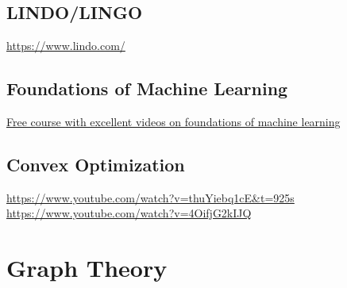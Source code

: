 \documentclass[letter,12pt]{book}
\renewcommand{\0}{\mathbf{0}}
\begin{document}
\section{LINDO/LINGO}
\url{https://www.lindo.com/}

\section{Foundations of Machine Learning}
\href{https://bloomberg.github.io/foml/#home}{Free course with excellent videos on foundations of machine learning}
\section{Convex Optimization}
\url{https://www.youtube.com/watch?v=thuYiebq1cE&t=925s}
\url{https://www.youtube.com/watch?v=4OifjG2kIJQ}

\chapter{Graph Theory}


	\cleardoublepage
	\printindex

%	
\end{document}
